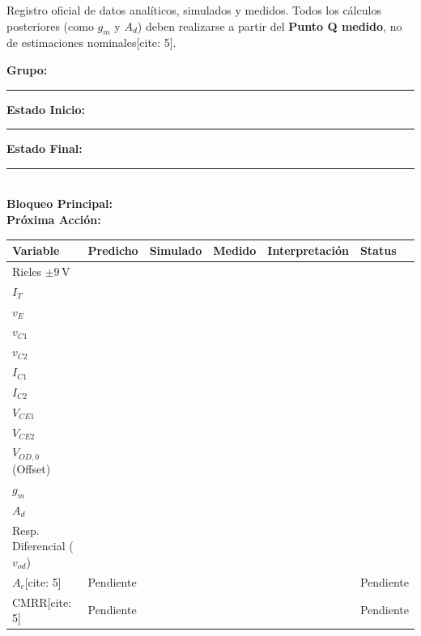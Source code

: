 \documentclass[11pt, a4paper]{article}
\begin{document}
\begin{tcolorbox}[colback=ucbblue!5, colframe=ucbblue, title=\textbf{Matriz de Evidencia Actualizada (Hito 2)}]
    Registro oficial de datos analíticos, simulados y medidos. Todos los cálculos posteriores (como $g_m$ y $A_d$) deben realizarse a partir del \textbf{Punto Q medido}, no de estimaciones nominales[cite: 5].
\end{tcolorbox}

\noindent\textbf{Grupo:} \rule{3cm}{0.15mm} \hfill \textbf{Estado Inicio:} \rule{2.5cm}{0.15mm} \hfill \textbf{Estado Final:} \rule{2.5cm}{0.15mm} \\[0.3cm]
\noindent\textbf{Bloqueo Principal:} \hrulefill \\[0.3cm]
\noindent\textbf{Próxima Acción:} \hrulefill

\vspace{0.4cm}
\renewcommand{\arraystretch}{1.5}
\small %
\begin{tabularx}{\textwidth}{|>{\raggedright\arraybackslash}p{3.8cm}|>{\centering\arraybackslash}X|>{\centering\arraybackslash}X|>{\centering\arraybackslash}X|>{\raggedright\arraybackslash}X|>{\centering\arraybackslash}p{2.2cm}|}
\hline
\rowcolor{ucbblue!20}
\textbf{Variable} & \textbf{Predicho} & \textbf{Simulado} & \textbf{Medido} & \textbf{Interpretación} & \textbf{Status} \\ \hline
Rieles $\pm9\,\text{V}$ & & & & & \\ \hline
$I_T$ & & & & & \\ \hline
$v_E$ & & & & & \\ \hline
$v_{C1}$ & & & & & \\ \hline
$v_{C2}$ & & & & & \\ \hline
$I_{C1}$ & & & & & \\ \hline
$I_{C2}$ & & & & & \\ \hline
$V_{CE1}$ & & & & & \\ \hline
$V_{CE2}$ & & & & & \\ \hline
$V_{OD,0}$ (Offset) & & & & & \\ \hline
$g_m$ & & & & & \\ \hline
$A_d$ & & & & & \\ \hline
Resp. Diferencial ($v_{od}$) & & & & & \\ \hline
$A_c$[cite: 5] & Pendiente & & & & Pendiente \\ \hline
CMRR[cite: 5] & Pendiente & & & & Pendiente \\ \hline
\end{tabularx}
\normalsize %
\end{document}
